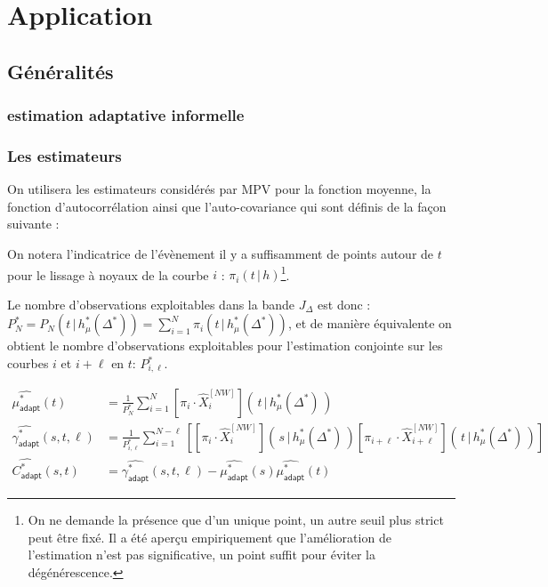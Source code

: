\chapter{
  Application
 }
\minitoc%

\section{Généralités}

\subsection{estimation adaptative informelle}

\subsection{Les estimateurs}


On utilisera les estimateurs considérés par MPV \cite{maissoro-SmoothnessFTSweakDep} pour la fonction moyenne, la fonction d'autocorrélation ainsi que l'auto-covariance qui sont définis de la façon suivante :

\noindent On notera l'indicatrice de l'évènement \og il y a suffisamment de points autour de $t$ pour le lissage à noyaux de la courbe $i$ \fg : $\pi_i(t \, | \, h)$\footnote{On ne demande la présence que d'un unique point, un autre seuil plus strict peut être fixé. Il a été aperçu empiriquement que l'amélioration de l'estimation n'est pas significative, un point suffit pour éviter la dégénérescence.}.

\noindent Le nombre d'observations exploitables dans la bande $J_\Delta$ est donc : $P_N^* =P_N(t \, | \, h_\mu^*(\Delta^*)) = \sum\limits_{i=1}^N \pi_i(t \, | \, h_\mu^*(\Delta^*))$, et de manière équivalente on obtient le nombre d'observations exploitables pour l'estimation conjointe sur les courbes $i$ et $i + \ell$ en $t$: $P_{i,\ell}^*$.

\begin{align}
	\widehat{\mu^*_{\textsf{adapt}}}(t)              & = \frac 1 {P_N^*} \sum_{i=1}^N \left[\pi_i \cdot \widehat X^{[NW]}_i\right]\left(\, t \, | \, h^*_\mu(\Delta^*) \, \right) \\
	\widehat {\gamma^*_{\textsf{adapt}}}(s, t, \ell) & = \frac 1 {P^*_{i, \ell}}\sum_{i=1}^{N- \ell} \left[
		\left[\pi_i \cdot \widehat X^{[NW]}_i\right]\left(\, s \, | \, h^*_\mu(\Delta^*) \, \right) \left[\pi_{i + \ell} \cdot \widehat X^{[NW]}_{i + \ell}\right]\left(\, t \, | \, h^*_\mu(\Delta^*) \, \right)
	\right]                                                                                                                                                                       \\
	\widehat {C^*_{\textsf{adapt}}}(s,t)             & = \widehat {\gamma^*_{\textsf{adapt}}}(s, t, \ell) -
	\widehat{\mu^*_{\textsf{adapt}}}(s)\widehat{\mu^*_{\textsf{adapt}}}(t)
\end{align}

